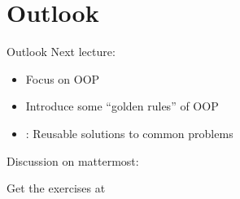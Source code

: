 \section{Outlook}

\begin{frame}{Outlook}
	Next lecture: 
	\begin{itemize}
		\item Focus on OOP
		\item Introduce some \enquote{golden rules} of OOP
		\item {}: Reusable solutions to common problems
	\end{itemize}

	\bigskip
	Discussion on mattermost: \href{https://mattermost.web.cern.ch/csc/channels/programming-paradigms}{}
	
	\bigskip
	Get the exercises at 
\end{frame}